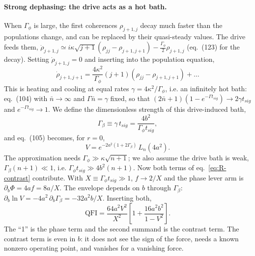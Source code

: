\paragraph{Strong dephasing: the drive acts as a hot bath.} When $\Gamma_\phi$ is large, the first coherences $\rho_{j+1,j}$ decay much faster than the populations change, and can be replaced by their quasi-steady values. The drive feeds them, $\dot{\rho}_{j+1,j} \simeq i\kappa\sqrt{j+1}(\rho_{jj} - \rho_{j+1,j+1}) - \tfrac{\Gamma_\phi}{2}\rho_{j+1,j}$ (eq.~(123) for the decay). Setting $\dot{\rho}_{j+1,j} = 0$ and inserting into the population equation,
\begin{equation*}
    \dot{\rho}_{j+1,j+1} = \frac{4\kappa^2}{\Gamma_\phi}(j+1)\left(\rho_{jj} - \rho_{j+1,j+1}\right) + \dots
\end{equation*}
This is heating and cooling at equal rates $\gamma = 4\kappa^2/\Gamma_\phi$, i.e. an infinitely hot bath: eq.~(104) with $\bar{n} \to \infty$ and $\Gamma\bar{n} = \gamma$ fixed, so that $(2\bar{n}+1)(1 - e^{-\Gamma t_{sig}}) \to 2\gamma t_{sig}$ and $e^{-\Gamma t_{sig}} \to 1$. We define the dimensionless strength of this drive-induced bath,
\begin{equation}
\label{eq:R-Gbeta}
    \Gamma_\beta \equiv \gamma\,t_{sig} = \frac{4b^2}{\Gamma_\phi t_{sig}},
\end{equation}
and eq.~(105) becomes, for $r = 0$,
\begin{equation}
\label{eq:R-Vstrong}
    V = e^{-2a^2(1 + 2\Gamma_\beta)}\,L_n(4a^2).
\end{equation}
The approximation needs $\Gamma_\phi \gg \kappa\sqrt{n+1}$; we also assume the drive bath is weak, $\Gamma_\beta(n+1) \ll 1$, i.e. $\Gamma_\phi t_{sig} \gg 4b^2(n+1)$. Now both terms of eq.~\eqref{eq:R-contrast} contribute. With $X \equiv \Gamma_\phi t_{sig} \gg 1$, $f \to 2/X$ and the phase lever arm is $\partial_b\Phi = 4af = 8a/X$. The envelope depends on $b$ through $\Gamma_\beta$: $\partial_b\ln V = -4a^2\,\partial_b\Gamma_\beta = -32a^2b/X$. Inserting both,
\begin{equation}
\label{eq:R-strong}
    \mathrm{QFI} = \frac{64a^2V^2}{X^2}\left[1 + \frac{16a^2b^2}{1 - V^2}\right].
\end{equation}
The ``1'' is the phase term and the second summand is the contrast term. The contrast term is even in $b$: it does not see the sign of the force, needs a known nonzero operating point, and vanishes for a vanishing force.

